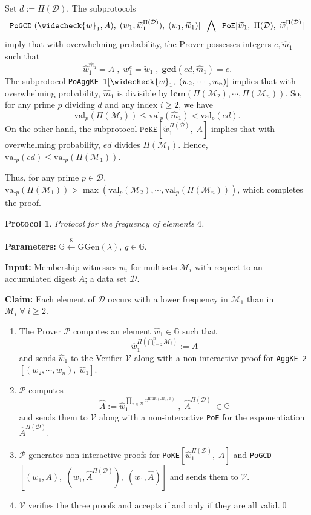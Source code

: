 \documentclass[11pt, lettersize, notitlepage, leqno, footskip=0.6cm]{article}
\newcommand{\pl}{\prod\limits}
\newcommand{\ttt}{\texttt}
\newcommand{\wti}{\widetilde}
\newcommand{\mc}{\mathcal}
\newcommand{\mb}{\mathbb}
\newcommand{\mbf}{\mathbf}
\newcommand{\mr}{\mathrm}
\newcommand{\lamb}{\lambda}
\newcommand{\what}{\widehat}
\newcommand{\weck}{\widecheck}
\newcommand{\mP}{\mc{P}}
\newcommand{\V}{\mc{V}}
\newcommand{\mcM}{\mc{M}}
\newcommand{\vs}{\vspace{-0.15cm}}
\newcommand{\noin}{\noindent}
\newcommand{\op}{overwhelming probability}
\newcommand{\nons}{non-interactive proofs}
\newcommand{\LCM}{\mbf{lcm}}
\newcommand{\GCD}{\mbf{gcd}}
\newtheorem{Prot}[Thm]{Protocol}
\numberwithin{equation}{section}
\begin{document}
\begin{prf} Set $d:= \Pi(\mc{D})$. The subprotocols \vs $$\ttt{PoGCD}[(\weck{w}_1, A),\;(w_1,\wti{w}_1^{\Pi(\mc{D})}),\;(w_1,\wti{w}_1)]\;\;\bigwedge\;\;\ttt{PoE}[\wti{w}_1,\;\Pi(\mc{D}),\;\wti{w}_1^{\Pi(\mc{D})}] $$ imply that with \op, the Prover possesses integers $e, \what{m}_1$ such that \vs $$\what{w}_1^{\what{m}_1} = A\;,\;w_1^{e} = \wti{w}_1\;,\; \GCD(ed, \what{m}_1)  = e .$$ The subprotocol \verb|PoAggKE-1|$[\weck{w}_1,\;(w_2,\cdots,w_n)]$ implies that with \op, $\what{m}_1$ is divisible by $\LCM(\Pi(\mcM_2),\cdots,\Pi(\mcM_n))$. So, for any prime $p$ dividing $d$ and any index $i\geq 2$, we have \vs $$\mr{val}_p(\Pi(\mcM_i)) \leq \mr{val}_p(\what{m}_1) < \mr{val}_p(ed).$$ On the other hand, the subprotocol $\ttt{PoKE}[\wti{w}_1^{\Pi(\mc{D})},\;A]$ implies that with \op, $ed$ divides $\Pi(\mcM_1)$. Hence, $\mr{val}_p(ed)\leq \mr{val}_p(\Pi(\mcM_1))$.

Thus, for any prime $p \in \mc{D}$, $\mr{val}_p(\Pi(\mcM_1))> \max(\mr{val}_p(\mcM_2),\cdots, \mr{val}_p(\Pi(\mcM_n)))$, which completes the proof.\end{prf}

\vspace{0.15cm}

\begin{Prot} Protocol for the frequency of elements $4$.\end{Prot} \vspace{-0.3cm}

\noin \textbf{Parameters:} $\mb{G}\xleftarrow{\$} \mr{GGen}(\lamb)$,\; $g\in \mb{G}$.

\noin \textbf{Input:} Membership witnesses $w_i$ for multisets $\mc{M}_i$ with respect to an accumulated digest $A$; a data set $\mc{D}$.

\noin \textbf{Claim:} Each element of $\mc{D}$ occurs with a lower frequency in $\mc{M}_1$ than in $\mc{M}_i\;\forall\;i\geq 2$. \vs

\begin{enumerate}[wide, labelwidth=!, labelindent=0pt] \vs

\item The Prover $\mP$ computes an element $\what{w}_1\in\mb{G}$ such that \vs $$\what{w}_1^{\Pi(\bigcap\limits_{i=2}^n \mc{M}_i)}:= A$$ and sends $\what{w}_1$ to the Verifier $\V$ along with a non-interactive proof for \verb|AggKE-2|$[(w_2,\cdots,w_n),\;\what{w}_1]$. \vspace{-0.5cm}

\item $\mP$ computes \vs $$\what{A}:= \what{w}_1^{\pl_{x\in\mc{D}}x^{\mr{mult}(\mc{M}_1,x)}}\;,\;\what{A}^{\Pi(\mc{D})}\;\in\mb{G}$$ and sends them to $\V$ along with a non-interactive \verb|PoE| for the exponentiation $\what{A}^{\Pi(\mc{D})}$. \vs

\item $\mP$ generates \nons\; for \verb|PoKE|$[\what{w}_1^{\Pi(\mc{D})},\;A]$ and \verb|PoGCD|$[(w_1,A),\;(w_1, \what{A}^{\Pi(\mc{D})}),\;(w_1, \what{A})]$ and sends them to $\V$. \vs

\item $\V$ verifies the three proofs and accepts if and only if they are all valid.\qed\end{enumerate}
\end{document}
